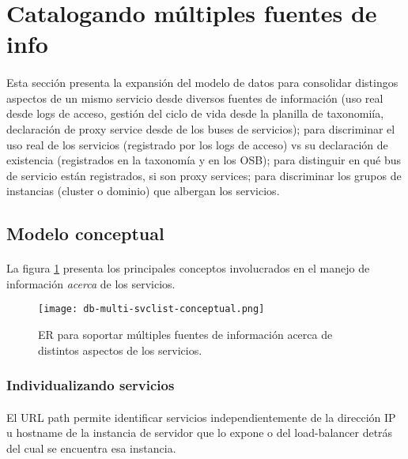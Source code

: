 \section{Catalogando m\'ultiples fuentes de info}
\paragraph{}
Esta secci\'on presenta la expansi\'on del modelo de datos
para consolidar distingos aspectos de un mismo servicio desde diversos
fuentes de informaci\'on
(uso real desde logs de acceso,
 gesti\'on del ciclo de vida desde la planilla de taxonomi\'ia,
 declaraci\'on de proxy service desde de los buses de servicios);
para discriminar el uso real de los servicios (registrado por los logs de acceso)
vs su declaraci\'on de existencia (registrados en la taxonom\'ia y en los OSB);
para distinguir en qu\'e bus de servicio est\'an registrados, si son proxy services;
para discriminar los grupos de instancias (cluster o dominio) que albergan los servicios.


\subsection{Modelo conceptual}\label{sec:multi-svclist-ER}
\paragraph{}
La figura \ref{fig:db-multi-er} presenta los principales conceptos involucrados
en el manejo de informaci\'on \emph{acerca} de los servicios.

\begin{figure}[htb]
    \centering
    \texttt{[image: db-multi-svclist-conceptual.png]}
    \caption{ER para soportar m\'ultiples fuentes de informaci\'on acerca de distintos aspectos de los servicios.}
    \label{fig:db-multi-er}
\end{figure}


\subsubsection{Individualizando servicios}
\paragraph{}
El URL path permite identificar servicios independientemente de
la direcci\'on IP u hostname de la instancia de servidor que lo expone
o del load-balancer detr\'as del cual se encuentra esa instancia.

